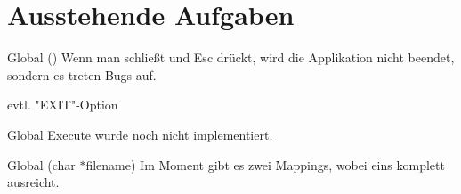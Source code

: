 \chapter{Ausstehende Aufgaben}
\hypertarget{todo}{}\label{todo}

\begin{DoxyRefList}
\item[Global \doxylink{auswahlmenu_8c_a8bf31ec161cc3926862b94331c7a7aab}{auswahlmenu} ()]\label{todo__todo000005}%
%
Wenn man  schließt und \textquotesingle{}Esc\textquotesingle{} drückt, wird die Applikation nicht beendet, sondern es treten Bugs auf. 



evtl. "{}\+EXIT"{}-\/Option  
\item[Global \doxylink{main_2src_2main_8c_a4858bb3109a37110e12bd7765d6f18ee}{baud} ]\label{todo__todo000008}%
%
Execute wurde noch nicht implementiert.  
\item[Global \doxylink{Compiler_8h_acfc2ab8416b01670f8bbb9da605780b4}{bin2mnem} (char \texorpdfstring{$\ast$}{*}filename)]\label{todo__todo000003}%
%
Im Moment gibt es zwei Mappings, wobei eins komplett ausreicht. 




\end{DoxyRefList}
